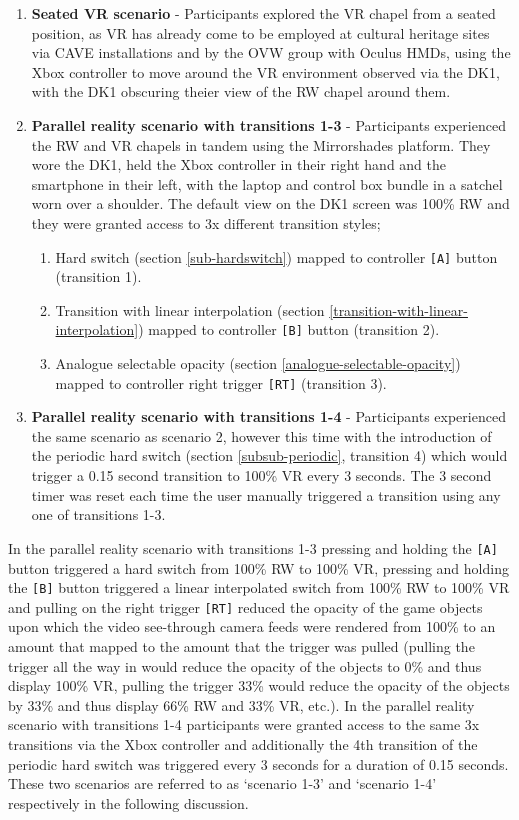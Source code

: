 \begin{enumerate}
	\item \textbf{Seated VR scenario} - Participants explored the VR chapel from a seated position, as VR has already come to be employed at cultural heritage sites via CAVE installations and by the OVW group with Oculus HMDs, using the Xbox controller to move around the VR environment observed via the DK1, with the DK1 obscuring theier view of the RW chapel around them.
	\item \textbf{Parallel reality scenario with transitions 1-3} - Participants experienced the RW and VR chapels in tandem using the Mirrorshades platform. They wore the DK1, held the Xbox controller in their right hand and the smartphone in their left, with the laptop and control box bundle in a satchel worn over a shoulder. The default view on the DK1 screen was 100\% RW and they were granted access to 3x different transition styles;
	\begin{enumerate}
		\item Hard switch (section \ref{sub-hardswitch}) mapped to controller \texttt{[A]} button (transition 1).
		\item Transition with linear interpolation (section \ref{transition-with-linear-interpolation}) mapped to controller \texttt{[B]} button (transition 2).
		\item Analogue selectable opacity (section \ref{analogue-selectable-opacity}) mapped to controller right trigger \texttt{[RT]} (transition 3).
\end{enumerate}
	\item \textbf{Parallel reality scenario with transitions 1-4} - Participants experienced the same scenario as scenario 2, however this time with the introduction of the periodic hard switch (section \ref{subsub-periodic}, transition 4) which would trigger a 0.15 second transition to 100\% VR every 3 seconds. The 3 second timer was reset each time the user manually triggered a transition using any one of transitions 1-3.
\end{enumerate}

In the parallel reality scenario with transitions 1-3 pressing and holding the \texttt{[A]} button triggered a hard switch from 100\% RW to 100\% VR, pressing and holding the \texttt{[B]} button triggered a linear interpolated switch from 100\% RW to 100\% VR and pulling on the right trigger \texttt{[RT]} reduced the opacity of the game objects upon which the video see-through camera feeds were rendered from 100\% to an amount that mapped to the amount that the trigger was pulled (pulling the trigger all the way in would reduce the opacity of the objects to 0\% and thus display 100\% VR, pulling the trigger 33\% would reduce the opacity of the objects by 33\% and thus display 66\% RW and 33\% VR, etc.). In the parallel reality scenario with transitions 1-4 participants were granted access to the same 3x transitions via the Xbox controller and additionally the 4th transition of the periodic hard switch was triggered every 3 seconds for a duration of 0.15 seconds. These two scenarios are referred to as `scenario 1-3' and `scenario 1-4' respectively in the following discussion.

